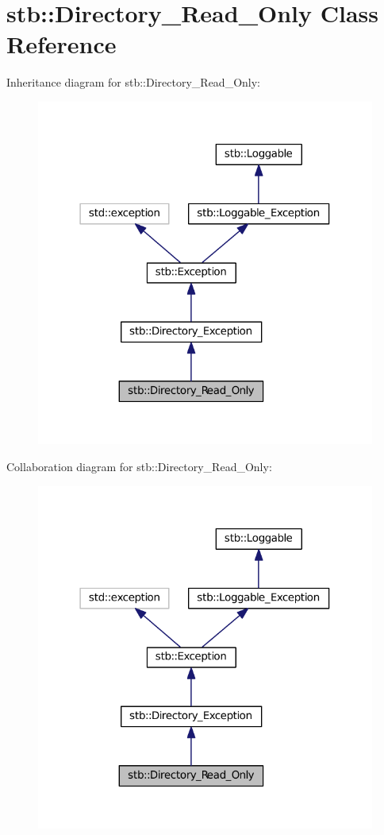 \hypertarget{classstb_1_1Directory__Read__Only}{\section{stb\+:\+:Directory\+\_\+\+Read\+\_\+\+Only Class Reference}
\label{classstb_1_1Directory__Read__Only}
}


Inheritance diagram for stb\+:\+:Directory\+\_\+\+Read\+\_\+\+Only\+:
\nopagebreak
\begin{figure}[H]
\begin{center}
\leavevmode
\includegraphics[width=316pt]{classstb_1_1Directory__Read__Only__inherit__graph}
\end{center}
\end{figure}


Collaboration diagram for stb\+:\+:Directory\+\_\+\+Read\+\_\+\+Only\+:
\nopagebreak
\begin{figure}[H]
\begin{center}
\leavevmode
\includegraphics[width=316pt]{classstb_1_1Directory__Read__Only__coll__graph}
\end{center}
\end{figure}
